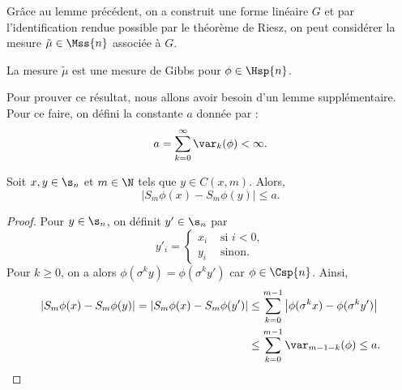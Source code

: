   Grâce au lemme précédent, on a construit une forme linéaire $G$ et par l'identification rendue possible par le théorème de Riesz,
  on peut considérer la mesure $\tilde{\mu} \in \Mss{n}$ associée à $G$.

  \begin{theorem}
    \label{thm:existence}
    \leanok
    La mesure $\tilde\mu$ est une mesure de Gibbs pour $\phi \in \Hsp{n}$.
  \end{theorem}

  Pour prouver ce résultat, nous allons avoir besoin d'un lemme supplémentaire. Pour ce faire, on défini la constante $a$ donnée par :
  $$a = \sum_{k=0}^{\infty}{\var_k(\phi)} < \infty.$$

  \begin{lemma}
    \label{lem:birkhoff_sum_ineq}
    \leanok
    Soit $x, y \in \s_n$ et $m \in \N$ tels que $y \in C(x, m)$.
    Alors,
    $$\left| S_m\phi(x) - S_m\phi(y)\right| \leq a.$$
  \end{lemma}

  \begin{proof}
    Pour $y \in \s_n$, on définit $y' \in \s_n$ par
    $$y'_i = \left\{\begin{array}{ll}
	x_i &\text{ si } i < 0, \\
	y_i &\text{ sinon.}
    \end{array}\right.$$
    Pour $k \geq 0$, on a alors $\phi(\sigma^ky) = \phi(\sigma^ky')$ car $\phi \in \Csp{n}$. Ainsi,
    \begin{align*}
      \left|S_m\phi(x) - S_m\phi(y)\right| = \left|S_m\phi(x) - S_m\phi(y')\right| &\leq \sum_{k=0}^{m-1}{\left|\phi(\sigma^kx) - \phi(\sigma^ky')\right|} \\
										   &\leq \sum_{k=0}^{m-1}{\var_{m-1-k}(\phi)} \leq a.
    \end{align*}
  \end{proof}

